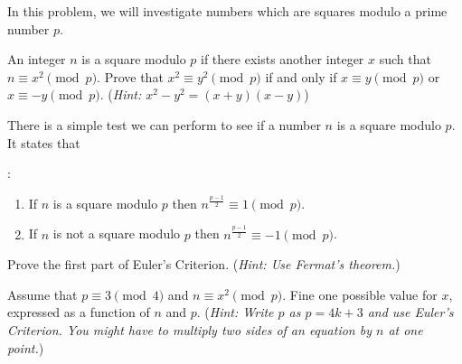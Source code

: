 \documentclass[12pt,twoside]{article}
\newcommand{\hint}[1]{({\it Hint: #1})}
\begin{document}
\begin{problem}{20} In this problem, we will investigate numbers which are squares modulo a prime number $p$.

\bparts

 An integer $n$ is a square modulo $p$ if there exists another integer $x$ such that $n \equiv x^2  \pmod p$. Prove that $x^2 \equiv y^2 \pmod p$ if and only if $x \equiv y \pmod p$ or $x \equiv -y \pmod p$.
\hint{$x^2-y^2 = (x+y)(x-y)$}


 There is a simple test we can perform to see if a number $n$ is a square modulo $p$. It states that
\begin{theorem}
:
\begin{enumerate}
\item If $n$ is a square modulo $p$ then $n^{\frac{p-1}{2}} \equiv 1 \pmod p$.
\item If $n$ is not a square modulo $p$ then $n^{\frac{p-1}{2}} \equiv -1 \pmod p$.
\end{enumerate} 
\end{theorem}

Prove the first part of Euler's Criterion.
\hint{Use Fermat's theorem.}


Assume that $p \equiv 3 \pmod 4$ and $n \equiv x^2 \pmod p$. Fine one possible value for $x$, expressed as a function of $n$ and $p$. 
\hint{Write $p$ as $p=4k+3$ and use Euler's Criterion. You might have to multiply two sides of an equation by $n$ at one point.}


\eparts

\end{problem}
\end{document}
